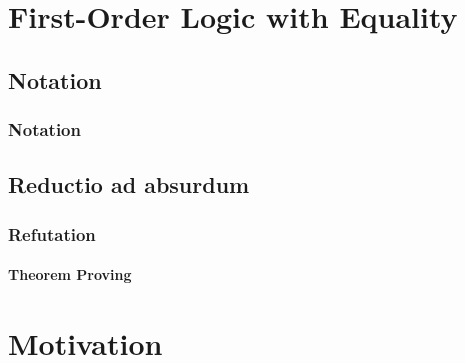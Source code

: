 

\section{First-Order Logic with Equality}

\subsection{Notation}

\begin{frame}
	\frametitle{Notation}
	
\end{frame}

\subsection{Reductio ad absurdum}

\begin{frame}
	\frametitle{Refutation}
	\framesubtitle{\FOL{}Theorem Proving}
	
\end{frame}

\section{Motivation}

\begin{frame}
	
\end{frame}

\begin{frame}
	
	
\end{frame}

\begin{frame}
	
\end{frame}
	

